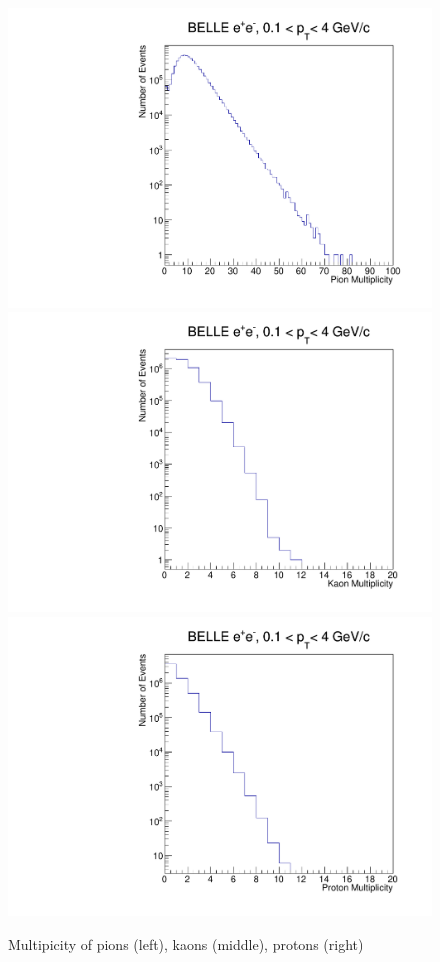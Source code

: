\documentclass[%
preprint,
 amsmath,amssymb,
 aps,
]{revtex4-1}
\begin{document}
\begin{figure}[!htb]
\begin{center}
\includegraphics[width=.45\textwidth]{figures/pion_mult.pdf}
\includegraphics[width=.45\textwidth]{figures/kaon_mult.pdf}
\includegraphics[width=.45\textwidth]{figures/proton_mult.pdf}
\caption{Multipicity of pions (left), kaons (middle), protons (right) }
\label{fig:ridgeBelle} 
\end{center}
\end{figure}
\end{document}
